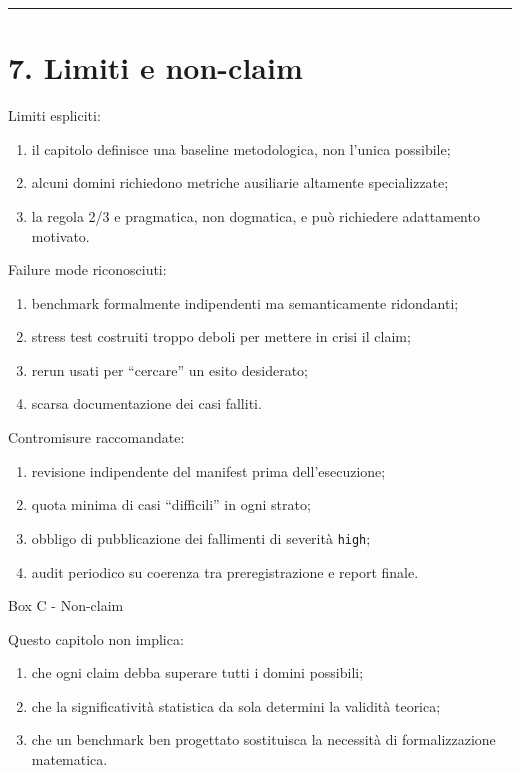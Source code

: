 \begin{center}\rule{0.5\linewidth}{0.5pt}\end{center}

\section{7. Limiti e non-claim}

Limiti espliciti:

\begin{enumerate}
\def\labelenumi{\arabic{enumi}.}
\tightlist
\item
  il capitolo definisce una baseline metodologica, non l'unica possibile;
\item
  alcuni domini richiedono metriche ausiliarie altamente specializzate;
\item
  la regola 2/3 e pragmatica, non dogmatica, e può richiedere adattamento motivato.
\end{enumerate}

Failure mode riconosciuti:

\begin{enumerate}
\def\labelenumi{\arabic{enumi}.}
\tightlist
\item
  benchmark formalmente indipendenti ma semanticamente ridondanti;
\item
  stress test costruiti troppo deboli per mettere in crisi il claim;
\item
  rerun usati per ``cercare'' un esito desiderato;
\item
  scarsa documentazione dei casi falliti.
\end{enumerate}

Contromisure raccomandate:

\begin{enumerate}
\def\labelenumi{\arabic{enumi}.}
\tightlist
\item
  revisione indipendente del manifest prima dell'esecuzione;
\item
  quota minima di casi ``difficili'' in ogni strato;
\item
  obbligo di pubblicazione dei fallimenti di severità \texttt{high};
\item
  audit periodico su coerenza tra preregistrazione e report finale.
\end{enumerate}

Box C - Non-claim

Questo capitolo non implica:

\begin{enumerate}
\def\labelenumi{\arabic{enumi}.}
\tightlist
\item
  che ogni claim debba superare tutti i domini possibili;
\item
  che la significatività statistica da sola determini la validità teorica;
\item
  che un benchmark ben progettato sostituisca la necessità di formalizzazione matematica.
\end{enumerate}

